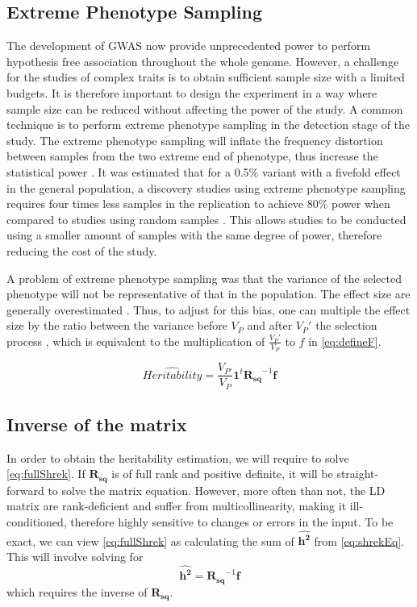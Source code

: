 \documentclass[12pt]{scrbook}
\begin{document}
\subsection{Extreme Phenotype Sampling}
The development of \gls{GWAS} now provide unprecedented power to perform hypothesis free association throughout the whole genome.
However, a challenge for the studies of complex traits is to obtain sufficient sample size with a limited budgets.
It is therefore important to design the experiment in a way where sample size can be reduced without affecting the power of the study.
A common technique is to perform extreme phenotype sampling in the detection stage of the study.
The extreme phenotype sampling will inflate the frequency distortion between samples from the two extreme end of phenotype, thus increase the statistical power \citep{Guey2011}.
It was estimated that for a 0.5\% variant with a fivefold effect in the general population, a discovery studies using extreme phenotype sampling requires four times less samples in the replication to achieve 80\% power when compared to studies using random samples \citep{Guey2011}.
This allows studies to be conducted using a smaller amount of samples with the same degree of power, therefore reducing the cost of the study.

A problem of extreme phenotype sampling was that the variance of the selected phenotype will not be representative of that in the population.
The effect size are generally overestimated \citep{Guey2011}. 
Thus, to adjust for this bias, one can multiple the effect size by the ratio between the variance before $V_P$ and after $V_{P}'$ the selection process \citep{Sham2014}, which is equivalent to the multiplication of $\frac{V_{P}'}{V_P}$ to $f$ in \cref{eq:defineF}.

\begin{equation}
\hat{Heritability} = \frac{V_{P'}}{V_P}\boldsymbol{1}^t\boldsymbol{R_{sq}}^{-1}\boldsymbol{f}
\label{eq:extremeShrek}
\end{equation}

\subsection{Inverse of the  matrix}
In order to obtain the heritability estimation, we will require to solve \cref{eq:fullShrek}. 
If $\boldsymbol{R_{sq}}$ is of full rank and positive definite, it will be straight-forward to solve the matrix equation.
However, more often than not, the \gls{LD} matrix are rank-deficient and suffer from multicollinearity, making it ill-conditioned, therefore highly sensitive to changes or errors in the input.
To be exact, we can view \cref{eq:fullShrek} as calculating the sum of $\boldsymbol{\hat{h^2}}$ from \cref{eq:shrekEq}.
This will involve solving for
\begin{equation}
\boldsymbol{\hat{h^2}} = \boldsymbol{R_{sq}}^{-1}\boldsymbol{f}
\label{eq:shrekInverse}
\end{equation}
which requires the inverse of $\boldsymbol{R_{sq}}$. 
\end{document}
